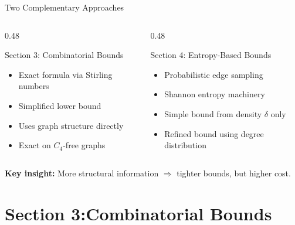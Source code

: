 \documentclass[10pt]{beamer}
\begin{document}
\begin{frame}{Two Complementary Approaches}
  \begin{columns}
    \begin{column}{0.48\textwidth}
      \begin{block}{Section 3: Combinatorial Bounds}
        \begin{itemize}
          \item Exact formula via Stirling numbers
          \item Simplified lower bound
          \item Uses graph structure directly
          \item Exact on $C_4$-free graphs
        \end{itemize}
      \end{block}
    \end{column}
    \begin{column}{0.48\textwidth}
      \begin{alertblock}{Section 4: Entropy-Based Bounds}
        \begin{itemize}
          \item Probabilistic edge sampling
          \item Shannon entropy machinery
          \item Simple bound from density $\delta$ only
          \item Refined bound using degree distribution
        \end{itemize}
      \end{alertblock}
    \end{column}
  \end{columns}
  \vspace{1em}
  \textbf{Key insight:} More structural information $\Rightarrow$ tighter bounds, but higher cost.
\end{frame}

\section{Section 3:Combinatorial Bounds}
\end{document}
